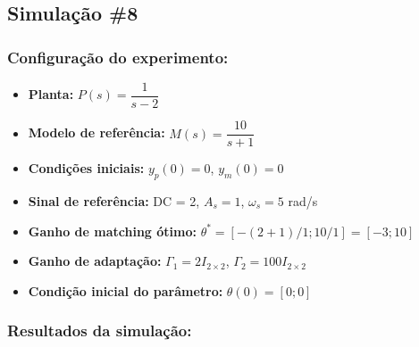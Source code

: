 \documentclass[10pt]{article}
\begin{document}
\newpage

\subsection{Simulação \#8}
\subsubsection{Configuração do experimento:}
\begin{itemize}
\item \textbf{Planta:} $P(s) = \dfrac{1}{s - 2}$
\item \textbf{Modelo de referência:} $M(s) = \dfrac{10}{s + 1}$
\item \textbf{Condições iniciais:} $y_p(0)=0$, $y_m(0)=0$
\item \textbf{Sinal de referência:} DC = 2, $A_s=1$, $\omega_s=5$ rad/s
\item \textbf{Ganho de matching ótimo:} $\theta^* = [-(2+1)/1;10/1] = [-3;10]$
\item \textbf{Ganho de adaptação:} $\Gamma_1 = 2I_{2\times2}$, $\Gamma_2 = 100I_{2\times2}$
\item \textbf{Condição inicial do parâmetro:} $\theta(0) = [0;0]$
\end{itemize}

\subsubsection{Resultados da simulação:}
\end{document}
